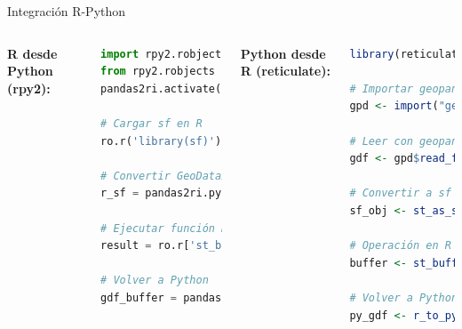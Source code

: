 \documentclass[10pt,aspectratio=169]{beamer}
\begin{document}
\begin{frame}{Integración R-Python}
    \begin{columns}[T]
        \textbf{R desde Python (rpy2):}
        \begin{lstlisting}[language=Python]
import rpy2.robjects as ro
from rpy2.robjects import pandas2ri
pandas2ri.activate()

# Cargar sf en R
ro.r('library(sf)')

# Convertir GeoDataFrame a sf
r_sf = pandas2ri.py2rpy(gdf)

# Ejecutar función R
result = ro.r['st_buffer'](r_sf, 1000)

# Volver a Python
gdf_buffer = pandas2ri.rpy2py(result)
        \end{lstlisting}
        
        \textbf{Python desde R (reticulate):}
        \begin{lstlisting}[language=R]
library(reticulate)

# Importar geopandas
gpd <- import("geopandas")

# Leer con geopandas
gdf <- gpd$read_file("data.shp")

# Convertir a sf
sf_obj <- st_as_sf(gdf)

# Operación en R
buffer <- st_buffer(sf_obj, 1000)

# Volver a Python
py_gdf <- r_to_py(buffer)
        \end{lstlisting}
    \end{columns}
\end{frame}
\end{document}
